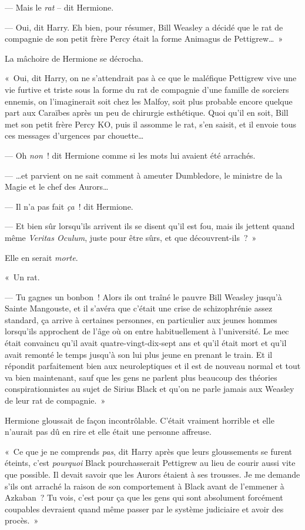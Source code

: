 --- Mais le \emph{rat} -- dit Hermione.

--- Oui, dit Harry. Eh bien, pour résumer, Bill Weasley a décidé que le rat de compagnie de son petit frère Percy était la forme Animagus de Pettigrew…~»

La mâchoire de Hermione se décrocha.

«~Oui, dit Harry, on ne s'attendrait pas à ce que le maléfique Pettigrew vive une vie furtive et triste sous la forme du rat de compagnie d'une famille de sorciers ennemis, on l'imaginerait soit chez les Malfoy, soit plus probable encore quelque part aux Caraïbes après un peu de chirurgie esthétique. Quoi qu'il en soit, Bill met son petit frère Percy KO, puis il assomme le rat, s'en saisit, et il envoie tous ces messages d'urgences par chouette…

--- Oh \emph{non}~! dit Hermione comme si les mots lui avaient été arrachés.

--- …et parvient on ne sait comment à ameuter Dumbledore, le ministre de la Magie et le chef des Aurors…

--- Il n'a pas fait \emph{ça}~! dit Hermione.

--- Et bien sûr lorsqu'ils arrivent ils se disent qu'il est fou, mais ils jettent quand même \emph{Veritas Oculum}, juste pour être sûrs, et que découvrent-ils~?~»

Elle en serait \emph{morte}.

«~Un rat.

--- Tu gagnes un bonbon~! Alors ils ont traîné le pauvre Bill Weasley jusqu'à Sainte Mangouste, et il s'avéra que c'était une crise de schizophrénie assez standard, ça arrive à certaines personnes, en particulier aux jeunes hommes lorsqu'ils approchent de l'âge où on entre habituellement à l'université. Le mec était convaincu qu'il avait quatre-vingt-dix-sept ans et qu'il était mort et qu'il avait remonté le temps jusqu'à son lui plus jeune en prenant le train. Et il répondit parfaitement bien aux neuroleptiques et il est de nouveau normal et tout va bien maintenant, sauf que les gens ne parlent plus beaucoup des théories conspirationnistes au sujet de Sirius Black et qu'on ne parle jamais aux Weasley de leur rat de compagnie.~»

Hermione gloussait de façon incontrôlable. C'était vraiment horrible et elle n'aurait pas dû en rire et elle était une personne affreuse.

«~Ce que je ne comprends \emph{pas}, dit Harry après que leurs gloussements se furent éteints, c'est \emph{pourquoi} Black pourchasserait Pettigrew au lieu de courir aussi vite que possible. Il devait savoir que les Aurors étaient à ses trousses. Je me demande s'ils ont arraché la raison de son comportement à Black avant de l'emmener à Azkaban~? Tu vois, c'est pour ça que les gens qui sont absolument forcément coupables devraient quand même passer par le système judiciaire et avoir des procès.~»

